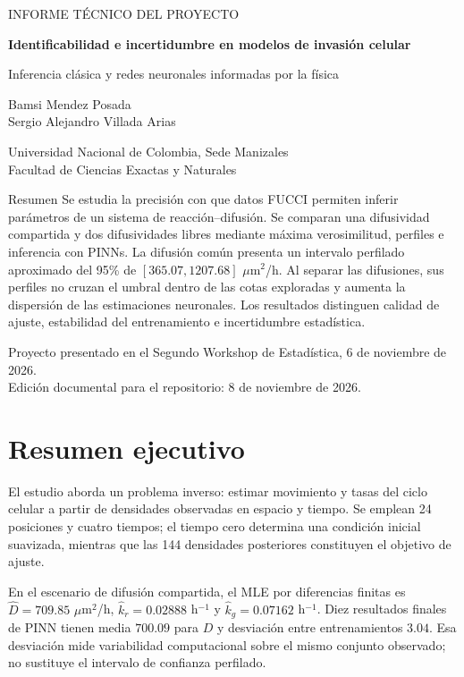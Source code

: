 \documentclass[11pt,a4paper]{report}
\begin{document}
\begin{titlepage}
\vspace*{1cm}
{\color{plum}\large INFORME TÉCNICO DEL PROYECTO\par}
\vspace{1cm}
{\Huge\bfseries Identificabilidad e incertidumbre en modelos de invasión celular\par}
\vspace{.7cm}
{\LARGE Inferencia clásica y redes neuronales informadas por la física\par}
\vspace{1.1cm}
{\large Bamsi Mendez Posada\\Sergio Alejandro Villada Arias\par}
\vspace{.6cm}
Universidad Nacional de Colombia, Sede Manizales\\
Facultad de Ciencias Exactas y Naturales
\vfill
\begin{idea}{Resumen}
Se estudia la precisión con que datos FUCCI permiten inferir parámetros de un sistema de reacción--difusión. Se comparan una difusividad compartida y dos difusividades libres mediante máxima verosimilitud, perfiles e inferencia con PINNs. La difusión común presenta un intervalo perfilado aproximado del 95\% de $[365.07,1207.68]$ $\mu$m$^2$/h. Al separar las difusiones, sus perfiles no cruzan el umbral dentro de las cotas exploradas y aumenta la dispersión de las estimaciones neuronales. Los resultados distinguen calidad de ajuste, estabilidad del entrenamiento e incertidumbre estadística.
\end{idea}
\vspace{.4cm}
Proyecto presentado en el Segundo Workshop de Estadística, 6 de noviembre de 2026.\\
Edición documental para el repositorio: 8 de noviembre de 2026.
\end{titlepage}
\setcounter{tocdepth}{0}
\tableofcontents
\chapter*{Resumen ejecutivo}
El estudio aborda un problema inverso: estimar movimiento y tasas del ciclo celular a partir de densidades observadas en espacio y tiempo. Se emplean 24 posiciones y cuatro tiempos; el tiempo cero determina una condición inicial suavizada, mientras que las 144 densidades posteriores constituyen el objetivo de ajuste.

En el escenario de difusión compartida, el MLE por diferencias finitas es $\widehat D=709.85$ $\mu$m$^2$/h, $\widehat k_r=0.02888$ h$^{-1}$ y $\widehat k_g=0.07162$ h$^{-1}$. Diez resultados finales de PINN tienen media $700.09$ para $D$ y desviación entre entrenamientos $3.04$. Esa desviación mide variabilidad computacional sobre el mismo conjunto observado; no sustituye el intervalo de confianza perfilado.
\end{document}
